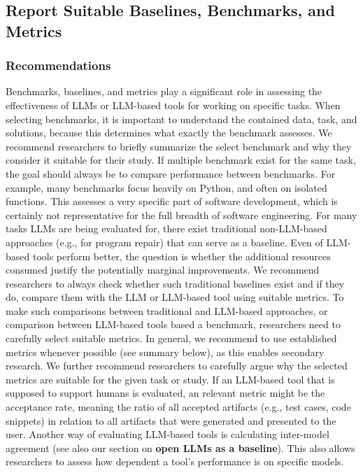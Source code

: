 \documentclass[11pt]{article}
\begin{document}
\subsection{Report Suitable Baselines, Benchmarks, and Metrics}

\subsubsection{Recommendations}

Benchmarks, baselines, and metrics play a significant role in assessing the effectiveness of LLMs or LLM-based tools for working on specific tasks.
When selecting benchmarks, it is important to understand the contained data, task, and solutions, because this determines what exactly the benchmark assesses.
We recommend researchers to briefly summarize the select benchmark and why they consider it suitable for their study.
If multiple benchmark exist for the same task, the goal should always be to compare performance between benchmarks.
For example, many benchmarks focus heavily on Python, and often on isolated functions. This assesses a very specific part of software development, which is certainly not representative for the full breadth of software engineering.
For many tasks LLMs are being evaluated for, there exist traditional non-LLM-based approaches (e.g., for program repair) that can serve as a baseline. Even of LLM-based tools perform better, the question is whether the additional resources consumed justify the potentially marginal improvements.
We recommend researchers to always check whether such traditional baselines exist and if they do, compare them with the LLM or LLM-based tool using suitable metrics.
To make such comparisons between traditional and LLM-based approaches, or comparison between LLM-based tools based a benchmark, researchers need to carefully select suitable metrics.
In general, we recommend to use established metrics whenever possible (see summary below), as this enables secondary research.
We further recommend researchers to carefully argue why the selected metrics are suitable for the given task or study. 
If an LLM-based tool that is supposed to support humans is evaluated, an relevant metric might be the acceptance rate, meaning the ratio of all accepted artifacts (e.g., test cases, code snippets) in relation to all artifacts that were generated and presented to the user.
Another way of evaluating LLM-based tools is calculating inter-model agreement (see also our section on \textbf{open LLMs as a baseline}).
This also allows researchers to assess how dependent a tool's performance is on specific models.
\end{document}
